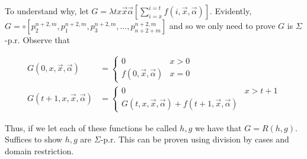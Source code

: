 \documentclass[a4paper, 12pt]{article}
\begin{document}
To understand why, let $G = \lambda tx \overrightarrow{x}\overrightarrow{\alpha}
\left[\sum_{i=x}^{i=t} f(i, \overrightarrow{x},
\overrightarrow{\alpha})\right]$. Evidently, $G = \circ \left[ p_2^{n+2, m},
p_1^{n + 2, m}, p_3^{n+2, m}, \ldots, p_{n+2+m}^{n+2, m} \right] $ and so we
only need to prove $G$ is $\Sigma$-p.r. Observe that 

\begin{align*}
    G(0, x, \overrightarrow{x}, \overrightarrow{\alpha}) &= \begin{cases}
        0 & x > 0 \\ 
        f(0, \overrightarrow{x}, \overrightarrow{\alpha}) & x = 0
    \end{cases} \\ 
    G(t + 1, x, \overrightarrow{x}, \overrightarrow{\alpha}) &= \begin{cases}
        0 & x > t  +1 \\ 
        G(t, x, \overrightarrow{x}, \overrightarrow{\alpha}) + f(t+1,
        \overrightarrow{x}, \overrightarrow{\alpha})
    \end{cases}
\end{align*}

Thus, if we let each of these functions be called $h, g$ we have that $G = R(h,
g)$. Suffices to show $h, g$ are $\Sigma$-p.r. This can be proven using
division by cases and domain restriction.
\end{document}
